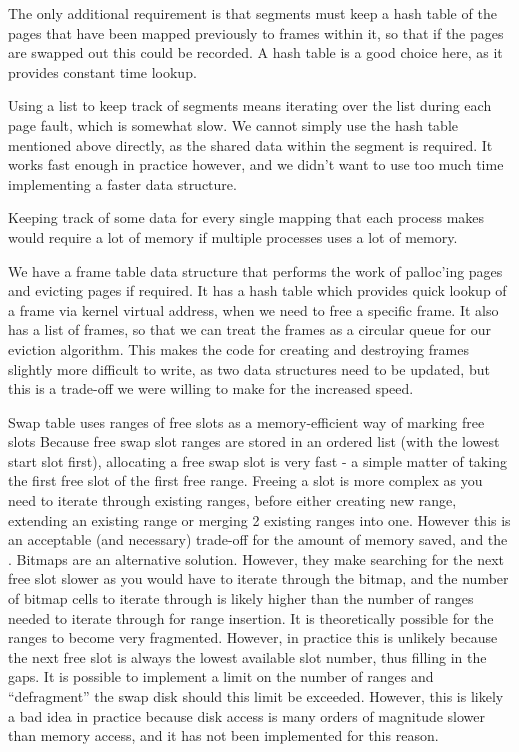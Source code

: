 The only additional requirement is that segments must keep a hash table of the
pages that have been mapped previously to frames within it, so that if the pages
are swapped out this could be recorded. A hash table is a good choice here, as
it provides constant time lookup.

Using a list to keep track of segments means iterating over the list during each
page fault, which is somewhat slow. We cannot simply use the hash table
mentioned above directly, as the shared data within the segment is required. It
works fast enough in practice however, and we didn't want to use too much time
implementing a faster data structure.

Keeping track of some data for every single mapping that each process makes would
require a lot of memory if multiple processes uses a lot of memory.

We have a frame table data structure that performs the work of palloc'ing pages
and evicting pages if required. It has a hash table which provides quick lookup
of a frame via kernel virtual address, when we need to free a specific frame. It
also has a list of frames, so that we can treat the frames as a circular queue
for our eviction algorithm. This makes the code for creating and destroying frames
slightly more difficult to write, as two data structures need to be updated, but
this is a trade-off we were willing to make for the increased speed.

Swap table
	uses ranges of free slots as a memory-efficient way of marking free slots
	Because free swap slot ranges are stored in an ordered list (with the lowest start slot first), allocating a free swap slot is very fast - a simple matter of taking the first free slot of the first free range.
	Freeing a slot is more complex as you need to iterate through existing ranges, before either creating new range, extending an existing range or merging 2 existing ranges into one. However this is an acceptable (and necessary) trade-off for the amount of memory saved, and the .
	Bitmaps are an alternative solution. However, they make searching for the next free slot slower as you would have to iterate through the bitmap, and the number of bitmap cells to iterate through is likely higher than the number of ranges needed to iterate through for range insertion.
	It is theoretically possible for the ranges to become very fragmented. However, in practice this is unlikely because the next free slot is always the lowest available slot number, thus filling in the gaps. It is possible to implement a limit on the number of ranges and ``defragment'' the swap disk should this limit be exceeded. However, this is likely a bad idea in practice because disk access is many orders of magnitude slower than memory access, and it has not been implemented for this reason.

